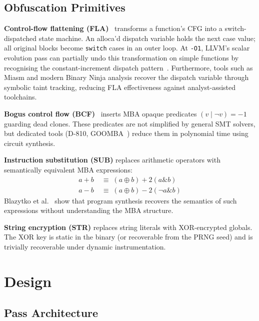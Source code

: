 \documentclass[conference]{IEEEtran}
\begin{document}
\subsection{Obfuscation Primitives}

\textbf{Control-flow flattening (FLA)}~\cite{laszlo2009obfuscating}
transforms a function's CFG into a switch-dispatched state machine.
An alloca'd dispatch variable holds the next case value; all original
blocks become \texttt{switch} cases in an outer loop.
At \texttt{-O1}, LLVM's scalar evolution pass can partially undo this
transformation on simple functions by recognising the
constant-increment dispatch pattern~\cite{banescu2016code}.
Furthermore, tools such as Miasm and modern Binary Ninja analysis
recover the dispatch variable through symbolic taint tracking, reducing
FLA effectiveness against analyst-assisted toolchains.

\textbf{Bogus control flow (BCF)}~\cite{collberg1997taxonomy} inserts
MBA opaque predicates $(v \mid \lnot v) = -1$ guarding dead clones.
These predicates are not simplified by general SMT solvers, but
dedicated tools (D-810, GOOMBA~\cite{liu2017d810,eyrolles2017mixedbool})
reduce them in polynomial time using circuit synthesis.

\textbf{Instruction substitution (SUB)} replaces arithmetic operators
with semantically equivalent MBA expressions:
\begin{align}
  a + b &\;\equiv\; (a \oplus b) + 2(a \mathbin{\&} b) \label{eq:add}\\
  a - b &\;\equiv\; (a \oplus b) - 2(\lnot a \mathbin{\&} b) \label{eq:sub}
\end{align}
Blazytko et al.~\cite{blazytko2017syntia} show that program synthesis
recovers the semantics of such expressions without understanding the
MBA structure.

\textbf{String encryption (STR)} replaces string literals with
XOR-encrypted globals.
The XOR key is static in the binary (or recoverable from the PRNG seed)
and is trivially recoverable under dynamic instrumentation.

\section{Design}
\label{sec:design}

\subsection{Pass Architecture}
\end{document}
